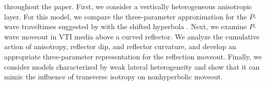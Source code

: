 throughout the paper. First, we consider a vertically heterogeneous
anisotropic layer. For this model, we compare the three-parameter
approximation for the $P$-wave traveltimes suggested by
\cite{tsvantom} with the shifted hyperbola \cite[]{malov,
castle,nmo}. Next, we examine $P$-wave moveout in VTI media above
a curved reflector. 
We analyze the cumulative action of anisotropy, reflector dip, and
reflector curvature, and develop an appropriate three-parameter representation
for the reflection moveout. Finally, we consider 
models characterized by weak lateral heterogeneity and show that 
it can mimic the influence of transverse isotropy on nonhyperbolic moveout. 

